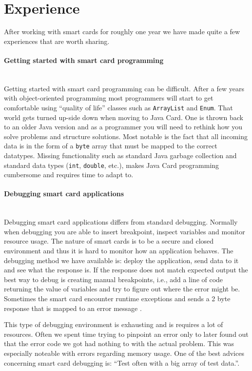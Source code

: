 \section{Experience}
After working with smart cards for roughly one year we have made quite a few experiences that are worth sharing.

\paragraph{Getting started with smart card programming}\mbox{}\\
Getting started with smart card programming can be difficult. After a few years with object-oriented programming most programmers will start to get comfortable using ``quality of life'' classes such as \texttt{ArrayList} and \texttt{Enum}. That world gets turned up-side down when moving to Java Card. One is  thrown back to an older Java version and as a programmer you will need to rethink how you solve problems and structure solutions. Most notable is the fact that all incoming data is in the form of a \texttt{byte} array that must be mapped to the correct datatypes. Missing functionality such as standard Java garbage collection and standard data types (\texttt{int}, \texttt{double}, etc.), makes Java Card programming cumbersome and requires time to adapt to.

\paragraph{Debugging smart card applications}\mbox{}\\
Debugging smart card applications differs from standard debugging. Normally when debugging you are able to insert breakpoint, inspect variables and monitor resource usage. The nature of smart cards is to be a secure and closed environment and thus it is hard to monitor how an application behaves. The debugging method we have available is: deploy the application, send data to it and see what the response is. If the response does not match expected output the best way to debug is creating manual breakpoints, i.e., add a line of code returning the value of variables and try to figure out where the error might be. Sometimes the smart card encounter runtime exceptions and sends a 2 byte response that is mapped to an error message \cite{javacardErrors}.

This type of debugging environment is exhausting and is requires a lot of resources. Often we spent time trying to pinpoint an error only to later found out that the error code we got had nothing to with the actual problem. This was especially noteable with errors regarding memory usage. One of the best advices concerning smart card debugging is: ``Test often with a big array of test data.''.

